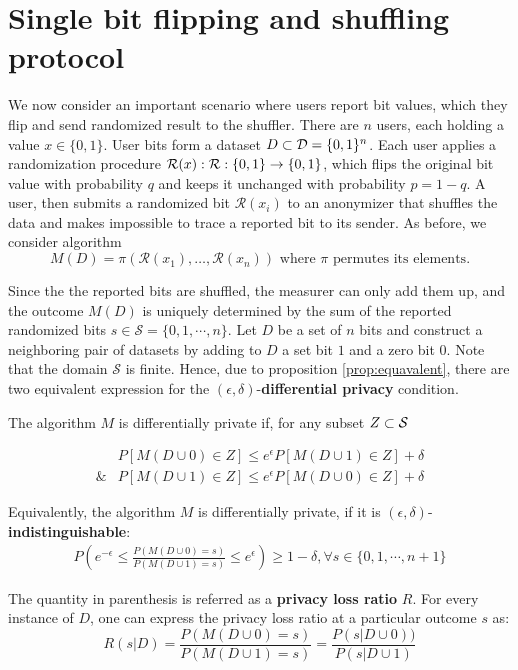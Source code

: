 \documentclass[11pt]{article}
\newcommand{\cR}{\mathcal{R}}
\newcommand{\Dsp}{\mathcal{D}}
\newcommand{\Ssp}{\mathcal{S}}
\begin{document}
\section{Single bit flipping and shuffling protocol}

We now consider an important scenario where users report bit values, which they flip and send randomized result to the shuffler. 
There are $n$ users, each holding a value $x \in \{0,1\}$.  User bits form a dataset $D  \cont \Dsp = \{0,1\}^n$. 
Each user applies a randomization procedure $\cR(x): \map{\cR}{\{0,1\}}{\{0,1\}}$, which flips the original bit value with probability $q$ and keeps it unchanged with probability $p=1-q$.  
A user, then submits a randomized bit $\cR(x_i)$ to an anonymizer that shuffles the data and makes impossible to trace a reported bit to its sender. As before, we consider algorithm
\[
M(D) = \pi (\cR(x_1), \dots , \cR(x_n)) \text{ where } \pi \text{ permutes its elements}. 
\]

Since the the reported bits are shuffled, the measurer can only add them up, and the outcome $M(D)$ is uniquely determined by the sum of the reported randomized bits $s \in \Ssp = \{0,1,\cdots,n\}$. Let $D$ be a set of $n$ bits and construct a neighboring pair of datasets by adding to $D$ a set bit $1$ and a zero bit $0$.  Note that the domain $\Ssp$ is finite.  Hence, due to proposition \ref{prop:equavalent}, there are two equivalent expression for the $(\epsilon,\delta)$-\textbf{differential privacy} condition.

The algorithm $M$ is differentially private if, for any subset $Z \cont  \Ssp$

\begin{align} \label{eq:bited} 
 & P[M(D \cup 0) \in Z] \le e^{\epsilon}P[M(D \cup 1) \in Z] + \delta \\
\& & P[M(D \cup 1) \in Z] \le e^{\epsilon}P[M(D \cup 0) \in Z] + \delta 
\end{align}

Equivalently, the algorithm $M$ is differentially private, if it is $(\epsilon,\delta)$-\textbf{indistinguishable}: 
\begin{align} \label{eq:bitind} 
P \left (   e^{-\epsilon} \le \frac{P(M(D \cup 0) = s)}{P(M(D \cup 1) = s)} \le e^{\epsilon} \right ) \ge 1 - \delta, \forall s \in \{0,1,\cdots,n+1\}
\end{align}

The quantity in parenthesis is referred as  a \textbf{privacy loss ratio} $R$.  For every instance of $D$, one can express the privacy loss ratio at a particular outcome $s$ as:
\begin{equation} \label{eq:1} 
R(s|D)= \frac{P(M(D \cup 0) = s)}{P(M(D \cup 1) = s)}  = \frac{P(s|D \cup 0) )}{P(s|D \cup 1)} 
\end{equation}
\end{document}
